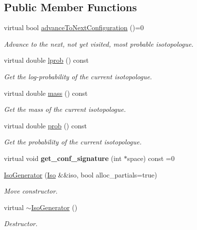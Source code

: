 \subsection*{Public Member Functions}
\begin{DoxyCompactItemize}
\item 
virtual bool \mbox{\hyperlink{class_iso_spec_1_1_iso_generator_a20f48ba18c6aecc57d73b2c3ec3a11dd}{advance\+To\+Next\+Configuration}} ()=0
\begin{DoxyCompactList}\small\item\em Advance to the next, not yet visited, most probable isotopologue. \end{DoxyCompactList}\item 
virtual double \mbox{\hyperlink{class_iso_spec_1_1_iso_generator_ae8e24abbce51a4c93994f630acfdf383}{lprob}} () const
\begin{DoxyCompactList}\small\item\em Get the log-\/probability of the current isotopologue. \end{DoxyCompactList}\item 
virtual double \mbox{\hyperlink{class_iso_spec_1_1_iso_generator_a34173228ef73e272e2ff0ae6ce58092d}{mass}} () const
\begin{DoxyCompactList}\small\item\em Get the mass of the current isotopologue. \end{DoxyCompactList}\item 
virtual double \mbox{\hyperlink{class_iso_spec_1_1_iso_generator_aecf1b3292fcc0857a86efe619a37fff0}{prob}} () const
\begin{DoxyCompactList}\small\item\em Get the probability of the current isotopologue. \end{DoxyCompactList}\item 
\mbox{\label{class_iso_spec_1_1_iso_generator_a19ca8af7dd97f8f37756d4267d49d91d}} 
virtual void {\bfseries get\+\_\+conf\+\_\+signature} (int $\ast$space) const =0
\item 
\mbox{\label{class_iso_spec_1_1_iso_generator_a89b5b851fbc67f79ed165af0b9b2a188}} 
\mbox{\hyperlink{class_iso_spec_1_1_iso_generator_a89b5b851fbc67f79ed165af0b9b2a188}{Iso\+Generator}} (\mbox{\hyperlink{class_iso_spec_1_1_iso}{Iso}} \&\&iso, bool alloc\+\_\+partials=true)
\begin{DoxyCompactList}\small\item\em Move constructor. \end{DoxyCompactList}\item 
\mbox{\label{class_iso_spec_1_1_iso_generator_a28442c8072a2e85faf5ff04f5feffd76}} 
virtual \mbox{\hyperlink{class_iso_spec_1_1_iso_generator_a28442c8072a2e85faf5ff04f5feffd76}{$\sim$\+Iso\+Generator}} ()
\begin{DoxyCompactList}\small\item\em Destructor. \end{DoxyCompactList}\end{DoxyCompactItemize}
